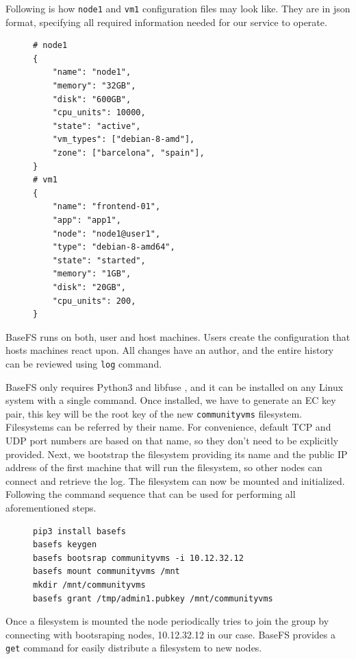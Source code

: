 \documentclass{sig-alternate}
\begin{document}
Following is how \texttt{node1} and \texttt{vm1} configuration files may look like. They are in json format, specifying all required information needed for our service to operate.

\begin{figure}[H]
\centering
\begin{BVerbatim}
# node1
{
    "name": "node1",
    "memory": "32GB",
    "disk": "600GB",
    "cpu_units": 10000,
    "state": "active",
    "vm_types": ["debian-8-amd"],
    "zone": ["barcelona", "spain"],
}
# vm1
{
    "name": "frontend-01",
    "app": "app1",
    "node": "node1@user1",
    "type": "debian-8-amd64",
    "state": "started",
    "memory": "1GB",
    "disk": "20GB",
    "cpu_units": 200,
}
\end{BVerbatim}
\end{figure}

BaseFS runs on both, user and host machines. Users create the configuration that hosts machines react upon. All changes have an author, and the entire history can be reviewed using \texttt{log} command.

BaseFS only requires Python3 and libfuse \cite{libfuse}, and it can be installed on any Linux system with a single command. Once installed, we have to generate an EC key pair, this key will be the root key of the new \texttt{communityvms} filesystem. Filesystems can be referred by their name. For convenience, default TCP and UDP port numbers are based on that name, so they don't need to be explicitly provided. Next, we bootstrap the filesystem providing its name and the public IP address of the first machine that will run the filesystem, so other nodes can connect and retrieve the log. The filesystem can now be mounted and initialized. Following the command sequence that can be used for performing all aforementioned steps.

\begin{figure}[H]
\centering
\begin{BVerbatim}
pip3 install basefs
basefs keygen
basefs bootsrap communityvms -i 10.12.32.12
basefs mount communityvms /mnt
mkdir /mnt/communityvms
basefs grant /tmp/admin1.pubkey /mnt/communityvms
\end{BVerbatim}
\end{figure}

Once a filesystem is mounted the node periodically tries to join the group by connecting with bootsraping nodes, 10.12.32.12 in our case. BaseFS provides a \texttt{get} command for easily distribute a filesystem to new nodes.
\end{document}
